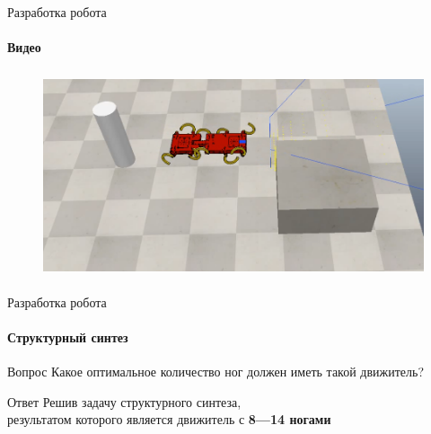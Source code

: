 \documentclass[aspectratio=169,xcolor=table]{beamer}
\begin{document}
\begin{frame}[t]{Разработка робота}
    \framesubtitle{Видео}
    \vspace{-0.6cm}
    \begin{figure}[H]
        \href{https://youtu.be/EQ6oGZVDpoc}{
            \centering\includegraphics[height=6cm,width=1\textwidth,keepaspectratio]{sidestep_segment_video_preview.png}}
    \end{figure}
\end{frame}

\begin{frame}[t]{Разработка робота}
    \framesubtitle{Структурный синтез}
    {\large\begin{block}{Вопрос}
            Какое оптимальное количество ног должен иметь такой движитель?
        \end{block}}
    {\large\begin{alertblock}{Ответ}
            \centering Решив задачу структурного синтеза,\\ результатом которого является движитель с \textbf{8---14 ногами}
        \end{alertblock}}
\end{frame}
\end{document}

